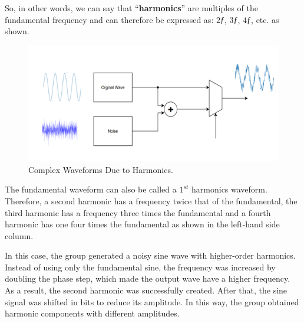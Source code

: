 So, in other words, we can say that “\textbf{harmonics}” are multiples of the fundamental frequency and can therefore be expressed as: $2ƒ$, $3ƒ$, $4ƒ$, etc. as shown.

\begin{figure}[H]
	\centering
	\includegraphics[width=0.8\linewidth]{./my-chapters/my-images/theoretical_background/noise_addnoise.png}
	\caption{Complex Waveforms Due to Harmonics.}
\end{figure}

The fundamental waveform can also be called a $1^{st}$ harmonics waveform. Therefore, a second harmonic has a frequency twice that of the fundamental, the third harmonic has a frequency three times the fundamental and a fourth harmonic has one four times the fundamental as shown in the left-hand side column.

In this case, the group generated a noisy sine wave with higher-order harmonics. Instead of using only the fundamental sine, the frequency was increased by doubling the phase step, which made the output wave have a higher frequency. As a result, the second harmonic was successfully created. After that, the sine signal was shifted in bits to reduce its amplitude. In this way, the group obtained harmonic components with different amplitudes.